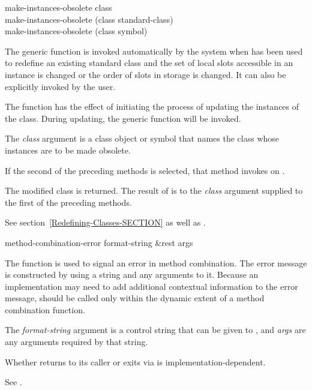 \begin{defun}
make-instances-obsolete class \\
make-instances-obsolete (class standard-class) \\
make-instances-obsolete (class symbol)

The generic function  is invoked
automatically by the system when  has been used to
redefine an existing standard class and the set of local slots accessible in an
instance is changed or the order of slots in storage is changed.  It
can also be explicitly invoked by the user.

The function  has the effect of
initiating the process of updating the instances of the
class. During updating, the generic function 
 will be invoked.

The \emph{class} argument is a class object or symbol that names
the class whose instances are to be made obsolete.

If the second of the preceding methods is selected, that method invokes
 on .

The modified class is returned.  The result of 
is  to the \emph{class} argument supplied to the first of the preceding
methods.

See section~\ref{Redefining-Classes-SECTION} as well as
.
\end{defun}

\begin{defun}[Function]
method-combination-error format-string &rest args

The function  is used to signal an error
in method combination.  The error message is constructed by using a
 string and any arguments to it.  Because an implementation may
need to add additional contextual information to the error message,
 should be called only within the
dynamic extent of a method combination function.

The \emph{format-string} argument is a control string that can be
given to , and \emph{args} are any arguments required by
that string.

Whether  returns to its caller or exits
via  is implementation-dependent.

See .
\end{defun}


